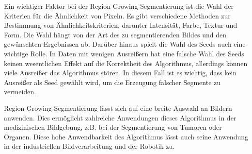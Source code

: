 Ein wichtiger Faktor bei der Region-Growing-Segmentierung ist die Wahl der Kriterien für die Ähnlichkeit von Pixeln. Es gibt verschiedene Methoden zur Bestimmung von Ähnlichkeitskriterien, darunter Intensität, Farbe, Textur und Form. Die Wahl hängt von der Art des zu segmentierenden Bildes und den gewünschten Ergebnissen ab. Darüber hinaus spielt die Wahl des Seeds auch eine wichtige Rolle. In Daten mit wenigen Ausreißern hat eine falsche Wahl des Seeds keinen wesentlichen Effekt auf die Korrektheit des Algorithmus, allerdings können viele Ausreißer das Algorithmus stören. In diesem Fall ist es wichtig, dass kein Ausreißer als Seed gewählt wird, um die Erzeugung falscher Segmente zu vermeiden. \autocite[641-643]{adams_seeded_1994}

Region-Growing-Segmentierung lässt sich auf eine breite Auswahl an Bildern anwenden. Dies ermöglicht zahlreiche Anwendungen dieses Algorithmus in der medizinischen Bildgebung, z.B. bei der Segmentierung von Tumoren oder Organen. Diese hohe Anwendbarkeit des Algorithmus lässt auch seine Anwendung in der industriellen Bildverarbeitung und der Robotik zu.\autocite[646]{adams_seeded_1994}
